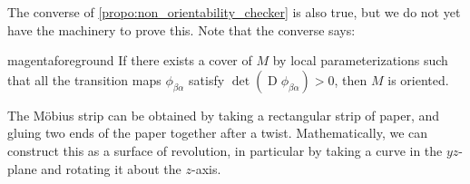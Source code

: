 \documentclass[notoc,notitlepage]{tufte-book}
\DeclareMathOperator{\D}{D}
\begin{document}
\begin{note}
  The converse of \cref{propo:non_orientability_checker} is also true, but we do
  not yet have the machinery to prove this. Note that the converse says:
  \begin{quotebox}{magenta}{foreground}
    If there exists a cover of $M$ by local parameterizations such that all the
    transition maps $\phi_{\beta\alpha}$ satisfy $\det(\D \phi_{\beta\alpha}) >
    0$, then $M$ is oriented.
  \end{quotebox}
\end{note}

\begin{eg}\label{eg:mobius_strip_is_non_orientable}
  The M\"{o}bius strip can be obtained by taking a rectangular strip of paper,
  and gluing two ends of the paper together after a twist. Mathematically, we
  can construct this as a surface of revolution, in particular by taking a curve
  in the $yz$-plane and rotating it about the $z$-axis.


\end{eg}
\end{document}
